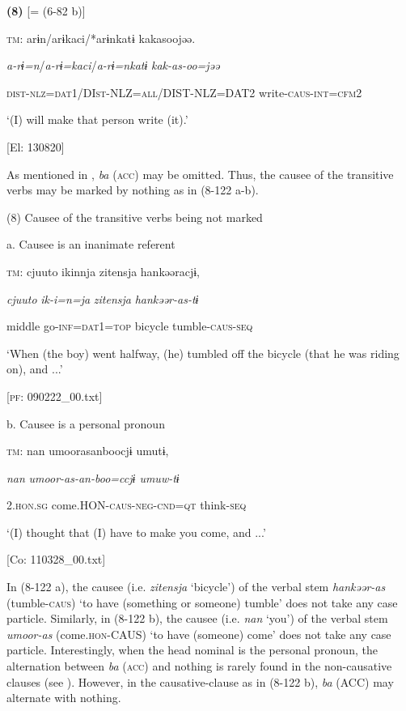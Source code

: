 \textbf{(8)}  [= (6-82 b)]

  \textsc{tm}:  arɨn/arɨkaci/*arɨnkatɨ  kakasoojəə.

    \textit{a-rɨ=n}/\textit{a-rɨ=kaci}/\textit{a-rɨ=nkatɨ}  \textit{kak-as{}-oo=jəə}

    \textsc{dist}-\textsc{nlz}=\textsc{dat}1/DI\textsc{st}-NLZ=\textsc{all}/DIST-NLZ=DAT2  write-\textsc{caus}-\textsc{int}=\textsc{cfm}2

    ‘(I) will make that person write (it).’

    [El: 130820]

  As mentioned in , \textit{ba} (\textsc{acc}) may be omitted. Thus, the causee of the transitive verbs may be marked by nothing as in (8-122 a-b).

(8)  Causee of the transitive verbs being not marked

  a. Causee is an inanimate referent

  \textsc{tm}:  cjuuto  ikinnja  {\textbar}zitensja{\textbar}  hankəəracjɨ,

    \textit{cjuuto}  \textit{ik-i=n=ja}  \textit{zitensja}  \textit{hankəər-as{}-tɨ}

    middle  go-\textsc{inf}=\textsc{dat}1=\textsc{top}  bicycle  tumble-\textsc{caus}-\textsc{seq}

    ‘When (the boy) went halfway, (he) tumbled off the bicycle (that he was riding on), and ...’

    [\textsc{pf}: 090222\_00.txt]

  b. Causee is a personal pronoun

  \textsc{tm}:  nan  umoorasanboocjɨ  umutɨ,

    \textit{nan}  \textit{umoor-as{}-an-boo=ccjɨ  umuw-tɨ}

    2.\textsc{hon}.\textsc{sg}  come.HON-\textsc{caus}-\textsc{neg}-\textsc{cnd}=\textsc{qt}  think-\textsc{seq}

    ‘(I) thought that (I) have to make you come, and ...’

    [Co: 110328\_00.txt]

In (8-122 a), the causee (i.e. \textit{zitensja} ‘bicycle’) of the verbal stem \textit{hankəər-as} (tumble-\textsc{caus}) ‘to have (something or someone) tumble’ does not take any case particle. Similarly, in (8-122 b), the causee (i.e. \textit{nan} ‘you’) of the verbal stem \textit{umoor-as} (come.\textsc{hon}-CAUS) ‘to have (someone) come’ does not take any case particle. Interestingly, when the head nominal is the personal pronoun, the alternation between \textit{ba} (\textsc{acc}) and nothing is rarely found in the non-causative clauses (see ). However, in the causative-clause as in (8-122 b), \textit{ba} (ACC) may alternate with nothing.


